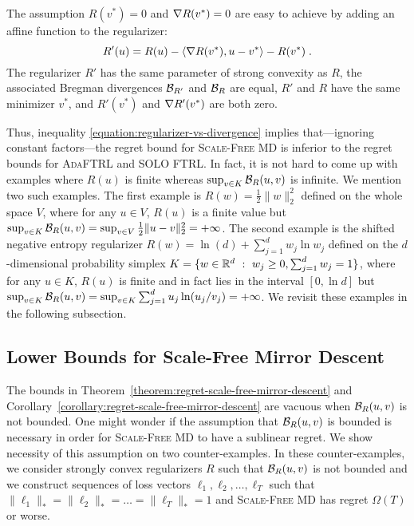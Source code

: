 The assumption $R(v^*) = 0$ and $\nabla R(v^*) = 0$
are easy to achieve by adding an affine function to the regularizer:
$$
R'(u) = R(u) - \langle \nabla R(v^*), u - v^* \rangle - R(v^*) \; .
$$
The regularizer $R'$ has the same parameter of strong convexity as $R$, the
associated Bregman divergences $\mathcal{B}_{R'}$ and $\mathcal{B}_{R}$ are equal, $R'$ and
$R$ have the same minimizer $v^*$, and $R'(v^*)$ and $\nabla R'(v^*)$ are both
zero.

Thus, inequality \eqref{equation:regularizer-vs-divergence} implies
that---ignoring constant factors---the regret bound for \textsc{Scale-Free MD}
is inferior to the regret bounds for \textsc{AdaFTRL} and \textsc{SOLO FTRL}.
In fact, it is not hard to come up with examples where $R(u)$ is finite whereas
$\sup_{v \in K} \mathcal{B}_R(u,v)$ is infinite. We mention two such examples. The
first example is $R(w) = \frac{1}{2}\|w\|_2^2$ defined on the whole space $V$,
where for any $u \in V$, $R(u)$ is a finite value but $\sup_{v \in K}
\mathcal{B}_R(u,v) = \sup_{v \in V} \frac{1}{2}\|u-v\|_2^2 = +\infty$. The second
example is the shifted negative entropy regularizer $R(w) = \ln(d) +
\sum_{j=1}^d w_j \ln w_j$ defined on the $d$-dimensional probability simplex $K
= \{ w \in \mathbb{R}^d ~:~ w_j \ge 0, \sum_{j=1}^d w_j = 1 \}$, where for any $u \in
K$, $R(u)$ is finite and in fact lies in the interval $[0, \ln d]$ but
$\sup_{v \in K} \mathcal{B}_R(u,v) = \sup_{v \in K} \sum_{j=1}^d u_j \ln(u_j/v_j) = +
\infty$. We revisit these examples in the following subsection.

\subsection{Lower Bounds for Scale-Free Mirror Descent}
\label{subsection:mirror-descent-lower-bound}

The bounds in Theorem~\ref{theorem:regret-scale-free-mirror-descent} and
Corollary~\ref{corollary:regret-scale-free-mirror-descent} are vacuous when
$\mathcal{B}_R(u,v)$ is not bounded. One might wonder if the assumption that
$\mathcal{B}_R(u,v)$ is bounded is necessary in order for \textsc{Scale-Free MD} to
have a sublinear regret. We show necessity of this assumption on two
counter-examples.  In these counter-examples, we consider strongly convex
regularizers $R$ such that $\mathcal{B}_R(u,v)$ is not bounded and we construct
sequences of loss vectors $\ell_1, \ell_2, \dots, \ell_T$ such that
$\|\ell_1\|_* = \|\ell_2\|_* = \dots = \|\ell_T\|_* = 1$ and \textsc{Scale-Free
MD} has regret $\Omega(T)$ or worse.

